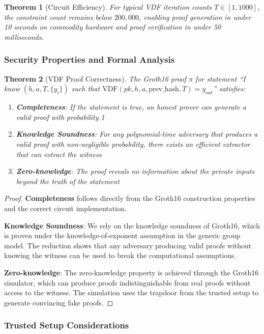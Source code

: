 \documentclass[11pt,a4paper]{article}
\newtheorem{theorem}{Theorem}[section]
\begin{document}
\begin{theorem}[Circuit Efficiency]
For typical VDF iteration counts $T \in [1, 1000]$, the constraint count remains below $200,000$, enabling proof generation in under 10 seconds on commodity hardware and proof verification in under 50 milliseconds.
\end{theorem}

\subsubsection{Security Properties and Formal Analysis}

\begin{theorem}[VDF Proof Correctness]
The Groth16 proof $\pi$ for statement ``I know $(h, a, T, \{y_i\})$ such that $\text{VDF}(pk, h, a, \text{prev\_hash}, T) = y_{out}$'' satisfies:
\begin{enumerate}
\item \textbf{Completeness}: If the statement is true, an honest prover can generate a valid proof with probability 1
\item \textbf{Knowledge Soundness}: For any polynomial-time adversary that produces a valid proof with non-negligible probability, there exists an efficient extractor that can extract the witness
\item \textbf{Zero-knowledge}: The proof reveals no information about the private inputs beyond the truth of the statement
\end{enumerate}
\end{theorem}

\begin{proof}
\textbf{Completeness} follows directly from the Groth16 construction properties and the correct circuit implementation.

\textbf{Knowledge Soundness}: We rely on the knowledge soundness of Groth16, which is proven under the knowledge-of-exponent assumption in the generic group model. The reduction shows that any adversary producing valid proofs without knowing the witness can be used to break the computational assumptions.

\textbf{Zero-knowledge}: The zero-knowledge property is achieved through the Groth16 simulator, which can produce proofs indistinguishable from real proofs without access to the witness. The simulation uses the trapdoor from the trusted setup to generate convincing fake proofs.
\end{proof}

\subsubsection{Trusted Setup Considerations}
\end{document}
